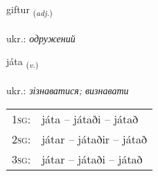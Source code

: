 \documentclass[frontgrid, backgrid]{flacards}\usepackage[]{graphicx}\usepackage[]{xcolor}
\begin{document}
\renewcommand{\flhead}{\vskip5pt \fboxsep=0pt {\small\bfseries\footnotesize Lýsingarorð | прикметник}}
\renewcommand{\fcfoot}{\vskip5pt \fboxsep=0pt \hspace{2pt}{\small\bfseries\footnotesize 2K}}

\renewcommand{\blhead}{\vskip5pt {\small\bfseries\footnotesize Lýsingarorð | прикметник }}
\renewcommand{\bcfoot}{\vskip5pt \hspace{2pt}{\small\bfseries\footnotesize 2K}}


{giftur \small{\textsubscript{(\textit{adj.})}} \\[1ex] %
\textphonetic{[cɪftʏr]} \\
ukr.: \emph{одружений} \\  [2ex]
\renewcommand*{\arraystretch}{0.8}
}

\renewcommand{\flhead}{\vskip5pt \fboxsep=0pt {\small\bfseries\footnotesize Sagnorð | дієслово}}
\renewcommand{\fcfoot}{\vskip5pt \fboxsep=0pt \hspace{2pt}{\small\bfseries\footnotesize 2K}}

\renewcommand{\blhead}{\vskip5pt {\small\bfseries\footnotesize Sagnorð | дієслово }}
\renewcommand{\bcfoot}{\vskip5pt \hspace{2pt}{\small\bfseries\footnotesize 2K}}


{játa \small{\textsubscript{(\textit{v.})}} \\[1ex] %
\textphonetic{[jauːta]} \\
ukr.: \emph{зізнаватися; визнавати} \\  [2ex]
\renewcommand*{\arraystretch}{0.8}
\begin{tabular}{p{1cm}l}
\textsc{1sg}: & játa -- játaði -- játað \\ 
\textsc{2sg}: & játar -- játaðir -- játað \\ 
\textsc{3sg}: & játar -- játaði -- játað \\ 
\end{tabular}
}
\end{document}
